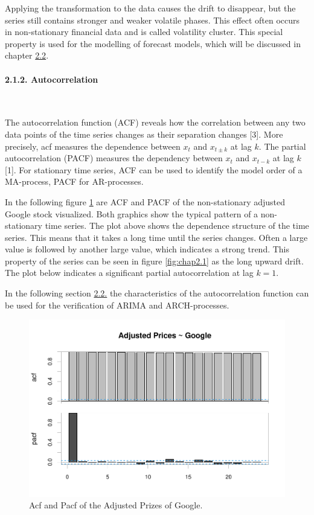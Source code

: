 \documentclass[
]{article}
\begin{document}
Applying the transformation to the data causes the drift to disappear,
but the series still contains stronger and weaker volatile phases. This
effect often occurs in non-stationary financial data and is called
volatility cluster. This special property is used for the modelling of
forecast models, which will be discussed in chapter
\protect\hyperlink{models-section}{2.2}.

\hypertarget{autocorrelation}{%
\paragraph{2.1.2. Autocorrelation}\label{autocorrelation}}

~

The autocorrelation function (ACF) reveals how the correlation between
any two data points of the time series changes as their separation
changes {[}3{]}. More precisely, acf measures the dependence between
\(x_{t}\) and \(x_{t \pm k}\) at lag \(k\). The partial autocorrelation
(PACF) measures the dependency between \(x_{t}\) and \(x_{t-k}\) at lag
\(k\) {[}1{]}. For stationary time series, ACF can be used to identify
the model order of a MA-process, PACF for AR-processes.

In the following figure \ref{fig:chap2.1.2} are ACF and PACF of the
non-stationary adjusted Google stock visualized. Both graphics show the
typical pattern of a non-stationary time series. The plot above shows
the dependence structure of the time series. This means that it takes a
long time until the series changes. Often a large value is followed by
another large value, which indicates a strong trend. This property of
the series can be seen in figure \ref{fig:chap2.1} as the long upward
drift. The plot below indicates a significant partial autocorrelation at
lag \(k=1\).

In the following section \protect\hyperlink{models-section}{2.2.} the
characteristics of the autocorrelation function can be used for the
verification of ARIMA and ARCH-processes.

\begin{figure}

{\centering \includegraphics[width=0.7\linewidth]{00_main_files/figure-latex/chap2.1.2-1} 

}

\caption{Acf and Pacf of the Adjusted Prizes of Google.}\label{fig:chap2.1.2}
\end{figure}
\end{document}
